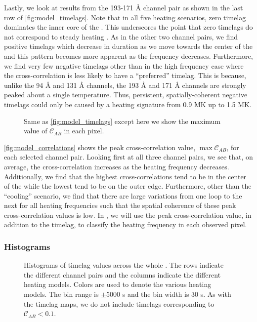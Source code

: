 Lastly, we look at results from the 193-171 \AA{} channel pair as shown in the last row of \autoref{fig:model_timelags}. Note that in all five heating scenarios, zero timelag dominates the inner core of the \AR{}. This underscores the point that zero timelags do not correspond to steady heating \citep[see][]{viall_transition_2015,viall_signatures_2016}. As in the other two channel pairs, we find positive timelags which decrease in duration as we move towards the center of the \AR{} and this pattern becomes more apparent as the frequency decreases. Furthermore, we find very few negative timelags other than in the high frequency case where the cross-correlation is less likely to have a ``preferred'' timelag. This is because, unlike the 94 \AA{} and 131 \AA{} channels, the 193 \AA{} and 171 \AA{} channels are strongly peaked about a single temperature. Thus, persistent, spatially-coherent negative timelags could only be caused by a heating signature from 0.9 MK up to 1.5 MK. 

\begin{figure*}
    \caption{Same as \autoref{fig:model_timelags} except here we show the maximum value of $\mathcal{C}_{AB}$ in each pixel.}
    \label{fig:model_correlations}
\end{figure*}

\autoref{fig:model_correlations} shows the peak cross-correlation value, $\max\mathcal{C}_{AB}$, for each selected channel pair. Looking first at all three channel pairs, we see that, on average, the cross-correlation increases as the heating frequency decreases. Additionally, we find that the highest cross-correlations tend to be in the center of the \AR{} while the lowest tend to be on the outer edge. Furthermore, other than the ``cooling'' scenario, we find that there are large variations from one loop to the next for all heating frequencies such that the spatial coherence of these peak cross-correlation values is low. In , we will use the peak cross-correlation value, in addition to the timelag, to classify the heating frequency in each observed pixel. 

\subsubsection{Histograms}\label{timelag_histograms}

\begin{figure*}
    \caption{Histograms of timelag values across the whole \AR{}. The rows indicate the different channel pairs and the columns indicate the different heating models. Colors are used to denote the various heating models. The bin range is $\pm5000$ s and the bin width is 30 s. As with the timelag maps, we do not include timelags corresponding to $\mathcal{C}_{AB}<0.1$.}
    \label{fig:timelag_histograms}
\end{figure*}

